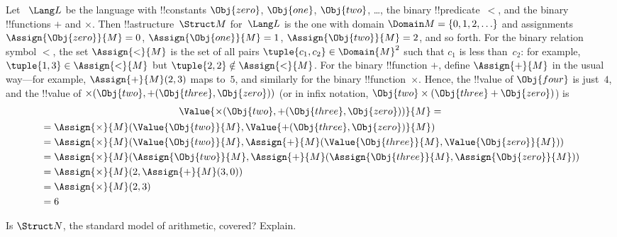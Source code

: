 \begin{ex}
Let ~$\Lang L$ be the language with !!{constant}s $\Obj{zero}$,
$\Obj{one}$, $\Obj{two}$, \dots, the binary !!{predicate}~$<$, and the
binary !!{function}s $+$ and $\times$. Then !!a{structure}~$\Struct
M$ for~$\Lang L$ is the one with domain $\Domain M = \{0, 1, 2, \ldots
\}$ and assignments $\Assign{\Obj{zero}}{M} = 0$,
$\Assign{\Obj{one}}{M} = 1$, $\Assign{\Obj{two}}{M} = 2$, and so
forth. For the binary relation symbol $<$, the set $\Assign{<}{M}$ is
the set of all pairs $\tuple{c_1, c_2} \in \Domain{M}^2$ such that
$c_1$ is less than~$c_2$: for example, $\tuple{1, 3} \in
\Assign{<}{M}$ but $\tuple{2, 2} \notin \Assign{<}{M}$. For the binary
!!{function} $+$, define $\Assign{+}{M}$ in the usual way---for
example, $\Assign{+}{M}(2,3)$ maps to~$5$, and similarly for the
binary !!{function}~$\times$. Hence, the !!{value} of $\Obj{four}$ is
just~$4$, and the !!{value} of $\times(\Obj{two},
+(\Obj{three},\Obj{zero}))$ (or in infix notation, $\Obj{two} \times
(\Obj{three} + \Obj{zero})$) is
\begin{multline*}
\Value{\times(\Obj{two}, +(\Obj{three},\Obj{zero}))}{M} =\\
\begin{aligned}
& =\Assign{\times}{M}(\Value{\Obj{two}}{M}, \Value{+(\Obj{three}, \Obj{zero})}{M})\\
& = \Assign{\times}{M}(\Value{\Obj{two}}{M}, \Assign{+}{M}(\Value{\Obj{three}}{M},
\Value{\Obj{zero}}{M})) \\
& = \Assign{\times}{M}(\Assign{\Obj{two}}{M}, \Assign{+}{M}(\Assign{\Obj{three}}{M},
\Assign{\Obj{zero}}{M})) \\
& = \Assign{\times}{M}(2, \Assign{+}{M}(3, 0)) \\
& = \Assign{\times}{M}(2, 3) \\
& = 6
\end{aligned}
\end{multline*}
\end{ex}

\begin{prob}
Is $\Struct N$, the standard model of arithmetic, covered? Explain.
\end{prob}







